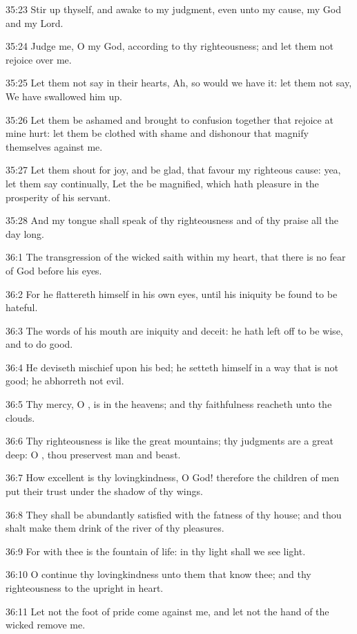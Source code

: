35:23 Stir up thyself, and awake to my judgment, even unto my cause,
my God and my Lord.

35:24 Judge me, O \LORD my God, according to thy righteousness; and let
them not rejoice over me.

35:25 Let them not say in their hearts, Ah, so would we have it: let
them not say, We have swallowed him up.

35:26 Let them be ashamed and brought to confusion together that
rejoice at mine hurt: let them be clothed with shame and dishonour
that magnify themselves against me.

35:27 Let them shout for joy, and be glad, that favour my righteous
cause: yea, let them say continually, Let the \LORD be magnified, which
hath pleasure in the prosperity of his servant.

35:28 And my tongue shall speak of thy righteousness and of thy praise
all the day long.



36:1 The transgression of the wicked saith within my heart, that there
is no fear of God before his eyes.

36:2 For he flattereth himself in his own eyes, until his iniquity be
found to be hateful.

36:3 The words of his mouth are iniquity and deceit: he hath left off
to be wise, and to do good.

36:4 He deviseth mischief upon his bed; he setteth himself in a way
that is not good; he abhorreth not evil.

36:5 Thy mercy, O \LORD, is in the heavens; and thy faithfulness
reacheth unto the clouds.

36:6 Thy righteousness is like the great mountains; thy judgments are
a great deep: O \LORD, thou preservest man and beast.

36:7 How excellent is thy lovingkindness, O God! therefore the
children of men put their trust under the shadow of thy wings.

36:8 They shall be abundantly satisfied with the fatness of thy house;
and thou shalt make them drink of the river of thy pleasures.

36:9 For with thee is the fountain of life: in thy light shall we see
light.

36:10 O continue thy lovingkindness unto them that know thee; and thy
righteousness to the upright in heart.

36:11 Let not the foot of pride come against me, and let not the hand
of the wicked remove me.

